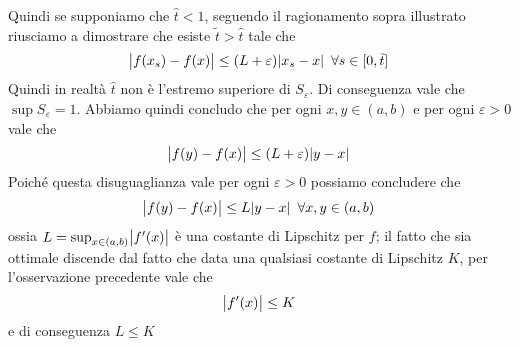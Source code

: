 \begin{remark}
\[    \]
    Quindi se supponiamo che $\widehat{t}<1$, seguendo il ragionamento sopra illustrato riusciamo a dimostrare che esiste $\tilde{t}>\widehat{t}$ tale che
    \[
    \abs{f(x_s)-f(x)}\le (L+\varepsilon)\abs{x_s-x} \ \forall s\in[0, \tilde{t}]
    \]
    Quindi in realtà $\widehat{t}$ non è l'estremo superiore di $S_\varepsilon$. Di conseguenza vale che $\sup S_\varepsilon = 1$. Abbiamo quindi concludo che per ogni $x,y\in(a,b)$ e per ogni $\varepsilon>0$ vale che
    \[
    \abs{f(y)-f(x)}\le (L+\varepsilon)\abs{y-x}
    \]
    Poiché questa disuguaglianza vale per ogni $\varepsilon>0$ possiamo concludere che
    \[
    \abs{f(y)-f(x)}\le L \abs{y-x} \ \forall{x,y}\in(a,b)
    \]
    ossia $L = \sup_{x\in(a,b)}\abs{f'(x)}$ è una costante di Lipschitz per $f$; il fatto che sia ottimale discende dal fatto che data una qualsiasi costante di Lipschitz $K$, per l'osservazione precedente vale che 
    \[
    \abs{f'(x)}\le K
    \]
    e di conseguenza $L\le K$
\end{remark}
